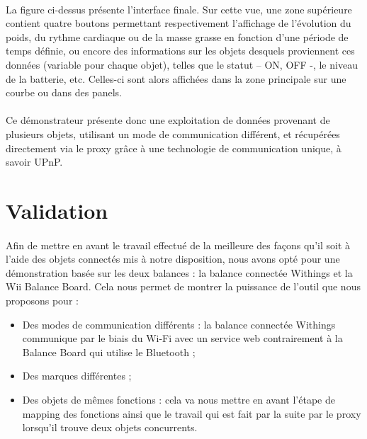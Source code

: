 \documentclass[nocopyrightspace]{sigplanconf}
\begin{document}
			\paragraph{}
			La figure ci-dessus présente l’interface finale. Sur cette vue, une zone supérieure contient quatre boutons permettant respectivement l’affichage de l’évolution du poids, du rythme cardiaque ou de la masse grasse en fonction d’une période de temps définie, ou encore des informations sur les objets desquels proviennent ces données (variable pour chaque objet), telles que le statut – ON, OFF -, le niveau de la batterie, etc. Celles-ci sont alors affichées dans la zone principale sur une courbe ou dans des panels. 

			\paragraph{}
			Ce démonstrateur présente donc une exploitation de données provenant de plusieurs objets, utilisant un mode de communication différent, et récupérées directement via le proxy grâce à une technologie de communication unique, à savoir UPnP.


\section{Validation}

	\paragraph{}
	Afin de mettre en avant le travail effectué de la meilleure des façons qu’il soit à l’aide des objets connectés mis à notre disposition, nous avons opté pour une démonstration basée sur les deux balances : la balance connectée Withings et la Wii Balance Board. Cela nous permet de montrer la puissance de l’outil que nous proposons pour :
	
	\begin{itemize}
	\item Des modes de communication différents : la balance connectée Withings communique par le biais du Wi-Fi avec un service web contrairement à la Balance Board qui utilise le Bluetooth ;
	\item Des marques différentes ;
	\item Des objets de mêmes fonctions : cela va nous mettre en avant l’étape de mapping des fonctions ainsi que le travail qui est fait par la suite par le proxy lorsqu’il trouve deux objets concurrents.
	\end{itemize}
\end{document}
